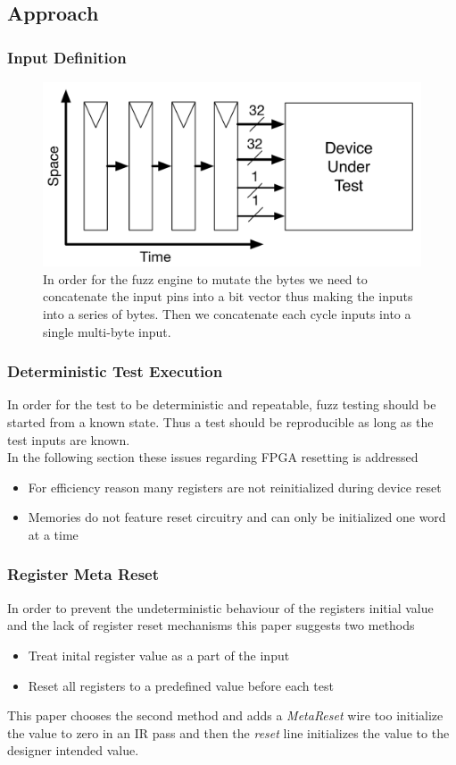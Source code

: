 \documentclass{beamer}
\begin{document}
\subsection{Approach}
\begin{frame}
    \frametitle{Input Definition}
    \begin{figure}
        \centering
        \includegraphics[width=1.0\textwidth]{input.png}
        \caption{In order for the fuzz engine to mutate the bytes we need to
        concatenate the input pins into a bit vector thus making the inputs
        into a series of bytes. Then we concatenate each cycle inputs into a
        single multi-byte input.}
        \label{fig:input}
    \end{figure}
\end{frame}

\begin{frame}
    \frametitle{Deterministic Test Execution}
    In order for the test to be deterministic and repeatable, fuzz testing
    should be started from a known state. Thus a test should be reproducible as
    long as the test inputs are known. \\
    In the following section these issues regarding FPGA resetting is addressed
    \begin{itemize}
        \item For efficiency reason many registers are not reinitialized during
            device reset
        \item Memories do not feature reset circuitry and can only be
            initialized one word at a time
    \end{itemize}
\end{frame}

\begin{frame}
    \frametitle{Register Meta Reset}
    In order to prevent the undeterministic behaviour of the registers initial
    value and the lack of register reset mechanisms this paper suggests two
    methods
    \begin{itemize}
        \item Treat inital register value as a part of the input
        \item Reset all registers to a predefined value before each test
    \end{itemize}
    This paper chooses the second method and adds a \textit{MetaReset} wire
    too initialize the value to zero in an IR pass and then the \textit{reset}
    line initializes the value to the designer intended value.
\end{frame}
\end{document}
